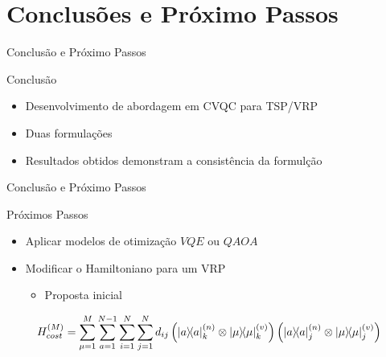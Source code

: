 \documentclass[xcolor={dvipsnames,table}]{beamer}
\begin{document}
\section{Conclusões e Próximo Passos}
\begin{frame}{Conclusão e Próximo Passos}
    \begin{block}{Conclusão}
        \begin{itemize}
            \item Desenvolvimento de abordagem em CVQC para TSP/VRP 
            \item Duas formulações 
            \item Resultados obtidos demonstram a consistência da formulção 
        \end{itemize}
        
    \end{block}
\end{frame}

\begin{frame}{Conclusão e Próximo Passos}
    \begin{block}{Próximos Passos}
        \begin{itemize}    
            \item Aplicar modelos de otimização $VQE$ ou $QAOA$
            \item Modificar o Hamiltoniano para um VRP 
            \begin{itemize}
                \item Proposta inicial
            \end{itemize}
        \end{itemize}

        \begin{equation*}
            H^{(M)}_{cost} =  \sum_{\mu=1}^{M} \sum_{a=1}^{N-1} \sum_{i=1}^{N} 
            \sum_{j=1}^{N} d_{ij} \left(\ketbra{a}{a}^{(n)}_k \otimes 
            \ketbra{\mu}{\mu}^{(v)}_k\right)  \left(\ketbra{a}{a}^{(n)}_j \otimes \ketbra{\mu}{\mu}^{(v)}_j\right)    
        \end{equation*}
        
    \end{block}
\end{frame}
\end{document}
